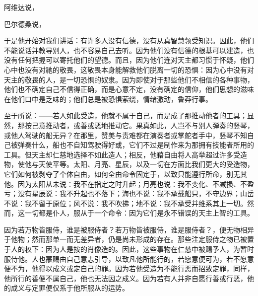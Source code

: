 阿维达说，\par

巴尔德桑说，\par

于是他开始对我们讲话：有许多人没有信德，没有从真智慧领受知识。因此，他们不能说话并教导别人，也不容易自己去听。因为他们没有信德的根基可以建造，也没有任何把握可以寄托他们的望德。而且，因为他们连对天主都习惯于怀疑，他们心中也没有对祂的敬畏，这敬畏本身能解救他们脱离一切的恐惧：因为心中没有对天主的敬畏的人，是一切恐惧的奴隶。因为即使对于那些他们不相信的各种事物，他们也不确定自己不信得正确，而是心意不定，没有确定的信仰，他们思想的滋味在他们口中是乏味的；他们总是被恐惧萦绕，情绪激动，鲁莽行事。\par

至于所说：——若人如此受造，他就不属于自己，而是成了那推动他者的工具；显然，那按己意推动者，或善或恶地推动它。果真如此，人岂不与别人弹奏的竖琴，或他人驾驶的船无异？在那里，赞美与责难都在演奏者或掌舵者手中，竖琴不知自己被弹奏什么，船也不自知驾驶得好或，它们不过是制作来为那拥有技能者所用的工具。但天主却仁慈地选择不如此造人；相反，他藉自由将人高举超过许多受造物，使他与天使平等。太阳、月亮、星辰，以及一切在方面比我们更大的受造物，它们如何被剥夺了个体自由，如何全由命令固定于，以致只能遵行所命，别无其他。因为太阳从未说：我不在指定之时升起；月亮也说：我不变化、不减损、不盈亏；没有星辰说：我不升起也不落下；海也不说：我不承载船只，不守边界；山岳不说：我不留于原位；风不说：我不吹拂；地不说：我不承受并维系其上一切。然而，这一切都是仆人，服从于一个命令：因为它们是永不错误的天主上智的工具。\par

因为若万物皆服侍，谁是被服侍者？若万物皆被服侍，谁是服侍者？，便无物相异于他物；然而那单一而无差异者，仍是尚未形成的存在。那些注定服侍之物已被置于人的权下：因为人是按的肖像造的。因此，这些事物在仁慈中被赐予人，为暂时服侍他。人也蒙赐由自己意志引导，以致凡他所能行的，若愿意便可为，若不愿意便不为，他得以成义或定自己的罪。因为若他受造为不能行恶而招致定罪，同样，他所行的善便不属自己，他也无法因之成义。因为若有人并非自愿行善或行恶，他的成义与定罪便仅系于他所服从的运势。\par

